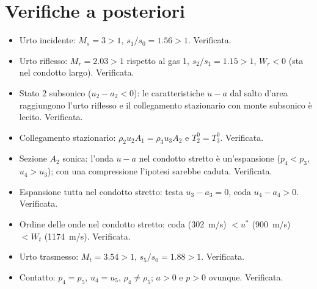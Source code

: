\documentclass[11pt,a4paper]{article}
\newcommand{\uma}{u-a}
\newcommand{\Mr}{M_{r}}
\begin{document}
\section{Verifiche a posteriori}
\begin{itemize}
  \item Urto incidente: $M_s=3>1$, $s_1/s_0=\num{1.56}>1$. Verificata.
  \item Urto riflesso: $\Mr=\num{2.03}>1$ rispetto al gas 1, $s_2/s_1=\num{1.15}>1$, $W_r<0$ (sta nel condotto
    largo). Verificata.
  \item Stato 2 subsonico ($u_2-a_2<0$): le caratteristiche $\uma$ dal salto d'area raggiungono l'urto riflesso e
    il collegamento stazionario con monte subsonico è lecito. Verificata.
  \item Collegamento stazionario: $\rho_2u_2A_1=\rho_3u_3A_2$ e $T^0_2=T^0_3$. Verificata.
  \item Sezione $A_2$ sonica: l'onda $\uma$ nel condotto stretto è un'espansione ($p_4<p_3$, $u_4>u_3$); con una
    compressione l'ipotesi sarebbe caduta. Verificata.
  \item Espansione tutta nel condotto stretto: testa $u_3-a_3=0$, coda $u_4-a_4>0$. Verificata.
  \item Ordine delle onde nel condotto stretto: coda (\SI{302}{m/s}) $<u^*$ (\SI{900}{m/s}) $<W_t$
    (\SI{1174}{m/s}). Verificata.
  \item Urto trasmesso: $M_t=\num{3.54}>1$, $s_5/s_0=\num{1.88}>1$. Verificata.
  \item Contatto: $p_4=p_5$, $u_4=u_5$, $\rho_4\ne\rho_5$; $a>0$ e $p>0$ ovunque. Verificata.
\end{itemize}

\end{document}
